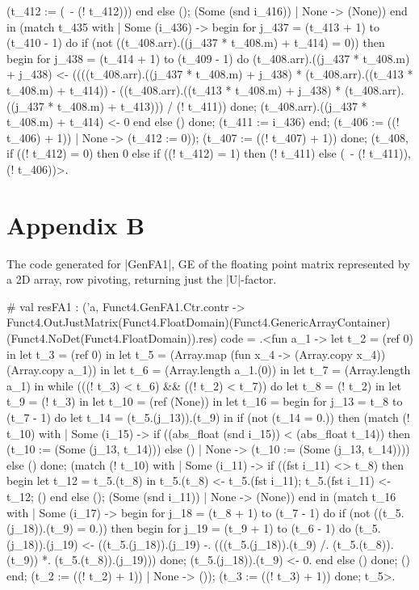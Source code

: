 \documentclass{llncs}
\begin{document}
\begin{code}
           (t_412 := (~- (! t_412)))
          end else ();
          (Some (snd i_416))
       | None -> (None))
     end in
    (match t_435 with
     | Some (i_436) ->
        begin
         for j_437 = (t_413 + 1) to (t_410 - 1) do
          if (not ((t_408.arr).((j_437 * t_408.m) + t_414) = 0)) then begin
           for j_438 = (t_414 + 1) to (t_409 - 1) do
            (t_408.arr).((j_437 * t_408.m) + j_438) <-
             ((((t_408.arr).((j_437 * t_408.m) + j_438) *
                 (t_408.arr).((t_413 * t_408.m) + t_414)) -
                ((t_408.arr).((t_413 * t_408.m) + j_438) *
                  (t_408.arr).((j_437 * t_408.m) + t_413))) / (! t_411))
           done;
           (t_408.arr).((j_437 * t_408.m) + t_414) <- 0
          end else ()
         done;
         (t_411 := i_436)
        end;
        (t_406 := ((! t_406) + 1))
     | None -> (t_412 := 0));
    (t_407 := ((! t_407) + 1))
   done;
   (t_408,
    if ((! t_412) = 0) then 0
    else if ((! t_412) = 1) then (! t_411)
    else (~- (! t_411)), (! t_406))>.
\end{code}
\section{Appendix B}
The code generated for |GenFA1|, GE of the floating point matrix
represented by a 2D array, row pivoting, returning just the |U|-factor.
\begin{code}
#   val resFA1 :
  ('a,
   Funct4.GenFA1.Ctr.contr ->
   Funct4.OutJustMatrix(Funct4.FloatDomain)(Funct4.GenericArrayContainer)
                       (Funct4.NoDet(Funct4.FloatDomain)).res)
  code =
  .<fun a_1 ->
   let t_2 = (ref 0) in
   let t_3 = (ref 0) in
   let t_5 = (Array.map (fun x_4 -> (Array.copy x_4)) (Array.copy a_1)) in
   let t_6 = (Array.length a_1.(0)) in
   let t_7 = (Array.length a_1) in
   while (((! t_3) < t_6) && ((! t_2) < t_7)) do
    let t_8 = (! t_2) in
    let t_9 = (! t_3) in
    let t_10 = (ref (None)) in
    let t_16 =
     begin
      for j_13 = t_8 to (t_7 - 1) do
       let t_14 = (t_5.(j_13)).(t_9) in
       if (not (t_14 = 0.)) then
        (match (! t_10) with
         | Some (i_15) ->
            if ((abs_float (snd i_15)) < (abs_float t_14)) then
             (t_10 := (Some (j_13, t_14)))
            else ()
         | None -> (t_10 := (Some (j_13, t_14))))
       else ()
      done;
      (match (! t_10) with
       | Some (i_11) ->
          if ((fst i_11) <> t_8) then begin
           let t_12 = t_5.(t_8) in
           t_5.(t_8) <- t_5.(fst i_11);
           t_5.(fst i_11) <- t_12;
           ()
          end else ();
          (Some (snd i_11))
       | None -> (None))
     end in
    (match t_16 with
     | Some (i_17) ->
        begin
         for j_18 = (t_8 + 1) to (t_7 - 1) do
          if (not ((t_5.(j_18)).(t_9) = 0.)) then begin
           for j_19 = (t_9 + 1) to (t_6 - 1) do
            (t_5.(j_18)).(j_19) <-
             ((t_5.(j_18)).(j_19) -.
               (((t_5.(j_18)).(t_9) /. (t_5.(t_8)).(t_9)) *.
                 (t_5.(t_8)).(j_19)))
           done;
           (t_5.(j_18)).(t_9) <- 0.
          end else ()
         done;
         ()
        end;
        (t_2 := ((! t_2) + 1))
     | None -> ());
    (t_3 := ((! t_3) + 1))
   done;
   t_5>.
\end{code}
\end{document}
